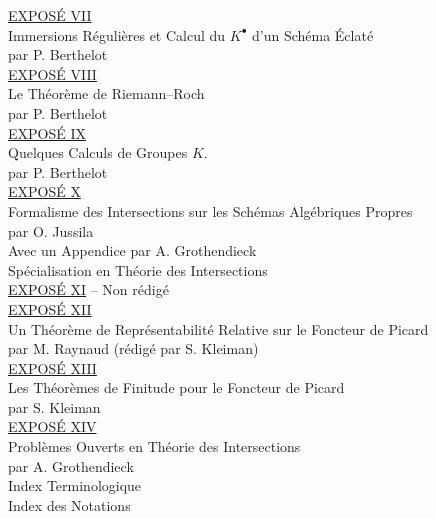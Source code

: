 \underline{EXPOSÉ VII}\\
Immersions Régulières et Calcul du $K^{\bullet}$ d'un Schéma Éclaté\\
par P. Berthelot \\[8pt]
\underline{EXPOSÉ VIII}\\
Le Théorème de Riemann--Roch\\
par P. Berthelot \\[8pt]
\underline{EXPOSÉ IX}\\
Quelques Calculs de Groupes $K$.\\
par P. Berthelot \\[8pt]
\underline{EXPOSÉ X}\\
Formalisme des Intersections sur les Schémas Algébriques Propres\\
par O. Jussila\\
Avec un Appendice par A. Grothendieck\\
Spécialisation en Théorie des Intersections \\[8pt]
\underline{EXPOSÉ XI} -- Non rédigé\\[8pt]
\underline{EXPOSÉ XII}\\
Un Théorème de Représentabilité Relative sur le Foncteur de Picard\\
par M. Raynaud (rédigé par S. Kleiman) \\[8pt]
\underline{EXPOSÉ XIII}\\
Les Théorèmes de Finitude pour le Foncteur de Picard\\
par S. Kleiman \\[8pt]
\underline{EXPOSÉ XIV}\\
Problèmes Ouverts en Théorie des Intersections\\
par A. Grothendieck \\[8pt]
Index Terminologique \\[4pt]
Index des Notations \par

